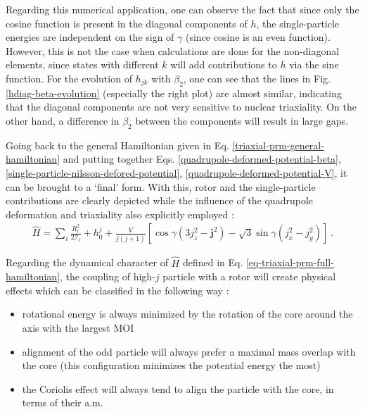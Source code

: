 Regarding this numerical application, one can observe the fact that since only the cosine function is present in the diagonal components of $h$, the single-particle energies are independent on the sign of $\gamma$ (since cosine is an even function). However, this is not the case when calculations are done for the non-diagonal elements, since states with different $k$ will add contributions to $h$ via the sine function. For the evolution of $h_{jk}$ with $\beta_2$, one can see that the lines in Fig. \ref{hdiag-beta-evolution} (especially the right plot) are almost similar, indicating that the diagonal components are not very sensitive to nuclear triaxiality. On the other hand, a difference in $\beta_2$ between the components will result in large gaps.

Going back to the general Hamiltonian given in Eq. \ref{triaxial-prm-general-hamiltonian} and putting together Eqs. \ref{quadrupole-deformed-potential-beta}, \ref{single-particle-nilsson-defored-potential}, \ref{quadrupole-deformed-potential-V}, it can be brought to a `final' form. With this, rotor and the single-particle contributions are clearly depicted while the influence of the quadrupole deformation and triaxiality also explicitly employed \cite{ring2004nuclear}:
\begin{align}
    \hat{H}=\sum_i\frac{R_i^2}{2\mathcal{I}_i}+h_0^j+\frac{V}{j(j+1)}\left[\cos\gamma(3j_z^2-\mathbf{j}^2)-\sqrt{3}\sin\gamma(j_x^2-j_y^2)\right]\ .
    \label{eq-triaxial-prm-full-hamiltonian}
\end{align}

Regarding the dynamical character of $\hat{H}$ defined in Eq. \ref{eq-triaxial-prm-full-hamiltonian}, the coupling of high-$j$ particle with a rotor will create physical effects which can be classified in the following way \cite{ring2004nuclear}:
\begin{itemize}
    \item rotational energy is always minimized by the rotation of the core around the axis with the largest MOI
    \item alignment of the odd particle will always prefer a maximal mass overlap with the core (this configuration minimizes the potential energy the most)
    \item the Coriolis effect will always tend to align the particle with the core, in terms of their a.m.
\end{itemize}

